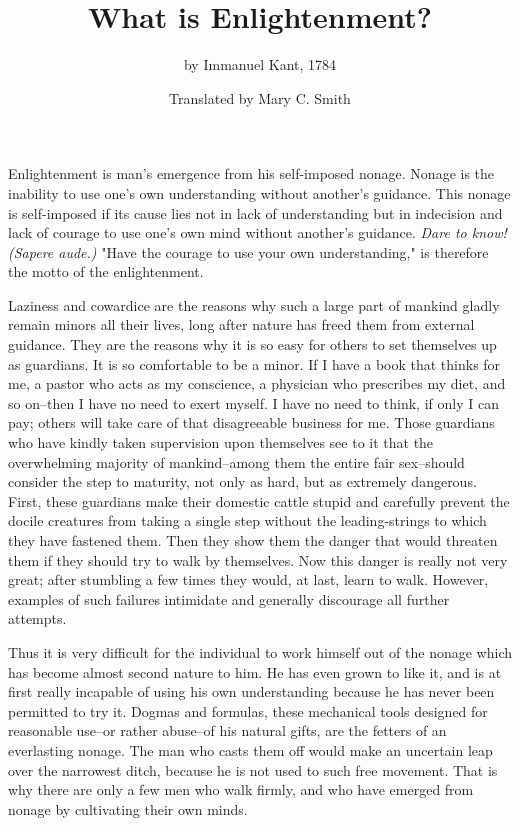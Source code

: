 \documentclass[12pt]{article}
\title{\vspace{-2.5cm}What is Enlightenment?\vspace{-8mm}}
\author{by Immanuel Kant, 1784}
\date{\vspace{-1em}\normalsize Translated by Mary C. Smith\vspace{-1em}}
\begin{document}
\maketitle

Enlightenment is man's emergence from his self-imposed nonage. Nonage is the inability to use one's own understanding without another's guidance. This nonage is self-imposed if its cause lies not in lack of understanding but in indecision and lack of courage to use one's own mind without another's guidance. \textit{Dare to know! (Sapere aude.)} "Have the courage to use your own understanding," is therefore the motto of the enlightenment.

Laziness and cowardice are the reasons why such a large part of mankind gladly remain minors all their lives, long after nature has freed them from external guidance. They are the reasons why it is so easy for others to set themselves up as guardians. It is so comfortable to be a minor. If I have a book that thinks for me, a pastor who acts as my conscience, a physician who prescribes my diet, and so on--then I have no need to exert myself. I have no need to think, if only I can pay; others will take care of that disagreeable business for me. Those guardians who have kindly taken supervision upon themselves see to it that the overwhelming majority of mankind--among them the entire fair sex--should consider the step to maturity, not only as hard, but as extremely dangerous. First, these guardians make their domestic cattle stupid and carefully prevent the docile creatures from taking a single step without the leading-strings to which they have fastened them. Then they show them the danger that would threaten them if they should try to walk by themselves. Now this danger is really not very great; after stumbling a few times they would, at last, learn to walk. However, examples of such failures intimidate and generally discourage all further attempts.

Thus it is very difficult for the individual to work himself out of the nonage which has become almost second nature to him. He has even grown to like it, and is at first really incapable of using his own understanding because he has never been permitted to try it. Dogmas and formulas, these mechanical tools designed for reasonable use--or rather abuse--of his natural gifts, are the fetters of an everlasting nonage. The man who casts them off would make an uncertain leap over the narrowest ditch, because he is not used to such free movement. That is why there are only a few men who walk firmly, and who have emerged from nonage by cultivating their own minds.
\end{document}
